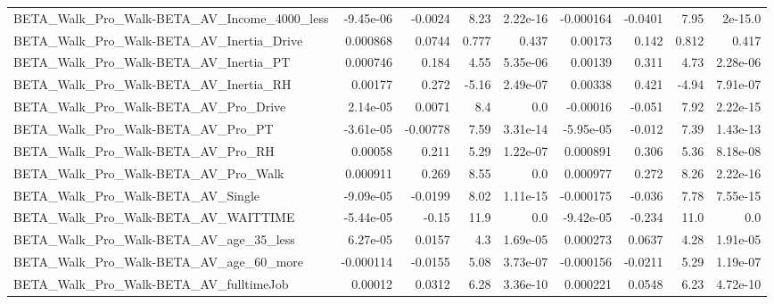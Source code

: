 \begin{tabular}{lrrrrrrrr}
BETA\_Walk\_Pro\_Walk-BETA\_AV\_Income\_4000\_less        &   -9.45e-06 &      -0.0024 &     8.23 & 2.22e-16 &  -0.000164 &     -0.0401 &         7.95 &       2e-15.0 \\
BETA\_Walk\_Pro\_Walk-BETA\_AV\_Inertia\_Drive           &    0.000868 &       0.0744 &    0.777 &    0.437 &    0.00173 &       0.142 &        0.812 &         0.417 \\
BETA\_Walk\_Pro\_Walk-BETA\_AV\_Inertia\_PT              &    0.000746 &        0.184 &     4.55 & 5.35e-06 &    0.00139 &       0.311 &         4.73 &      2.28e-06 \\
BETA\_Walk\_Pro\_Walk-BETA\_AV\_Inertia\_RH              &     0.00177 &        0.272 &    -5.16 & 2.49e-07 &    0.00338 &       0.421 &        -4.94 &      7.91e-07 \\
BETA\_Walk\_Pro\_Walk-BETA\_AV\_Pro\_Drive               &    2.14e-05 &       0.0071 &      8.4 &      0.0 &   -0.00016 &      -0.051 &         7.92 &      2.22e-15 \\
BETA\_Walk\_Pro\_Walk-BETA\_AV\_Pro\_PT                  &   -3.61e-05 &     -0.00778 &     7.59 & 3.31e-14 &  -5.95e-05 &      -0.012 &         7.39 &      1.43e-13 \\
BETA\_Walk\_Pro\_Walk-BETA\_AV\_Pro\_RH                  &     0.00058 &        0.211 &     5.29 & 1.22e-07 &   0.000891 &       0.306 &         5.36 &      8.18e-08 \\
BETA\_Walk\_Pro\_Walk-BETA\_AV\_Pro\_Walk                &    0.000911 &        0.269 &     8.55 &      0.0 &   0.000977 &       0.272 &         8.26 &      2.22e-16 \\
BETA\_Walk\_Pro\_Walk-BETA\_AV\_Single                  &   -9.09e-05 &      -0.0199 &     8.02 & 1.11e-15 &  -0.000175 &      -0.036 &         7.78 &      7.55e-15 \\
BETA\_Walk\_Pro\_Walk-BETA\_AV\_WAITTIME                &   -5.44e-05 &        -0.15 &     11.9 &      0.0 &  -9.42e-05 &      -0.234 &         11.0 &           0.0 \\
BETA\_Walk\_Pro\_Walk-BETA\_AV\_age\_35\_less             &    6.27e-05 &       0.0157 &      4.3 & 1.69e-05 &   0.000273 &      0.0637 &         4.28 &      1.91e-05 \\
BETA\_Walk\_Pro\_Walk-BETA\_AV\_age\_60\_more             &   -0.000114 &      -0.0155 &     5.08 & 3.73e-07 &  -0.000156 &     -0.0211 &         5.29 &      1.19e-07 \\
BETA\_Walk\_Pro\_Walk-BETA\_AV\_fulltimeJob             &     0.00012 &       0.0312 &     6.28 & 3.36e-10 &   0.000221 &      0.0548 &         6.23 &      4.72e-10 \\

\end{tabular}
